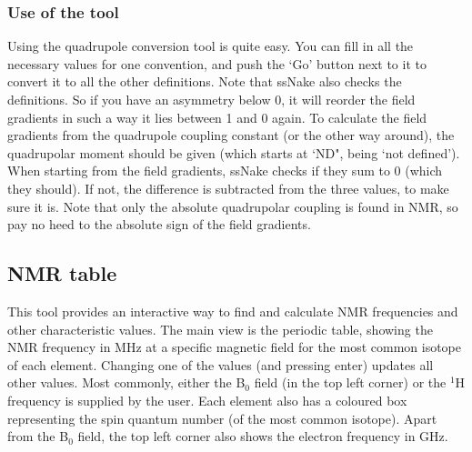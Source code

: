\documentclass[11pt,a4paper]{article}
\begin{document}
\subsubsection*{Use of the tool}
Using the quadrupole conversion tool is quite easy. You can fill in all the necessary values for one convention, and push the `Go' button next to it to convert it to all the other definitions. Note that ssNake also checks the definitions. So if you have an asymmetry below 0, it will reorder the field gradients in such a way it lies between 1 and 0 again. To calculate the field gradients from the quadrupole coupling constant (or the other way around), the quadrupolar moment should be given (which starts at `ND", being `not defined'). When starting from the field gradients, ssNake checks if they sum to 0 (which they should). If not, the difference is subtracted from the three values, to make sure it is. Note that only the absolute quadrupolar coupling is found in NMR, so pay no heed to the absolute sign of the field gradients.


\subsection{NMR table}
This tool provides an interactive way to find and calculate NMR frequencies and other characteristic
values. The main view is the periodic table, showing the NMR frequency in MHz at a specific magnetic
field for the most common isotope of each element. Changing one of the values (and pressing enter)
updates all other values. Most commonly, either the B$_0$ field (in the top left corner) or the
$^1$H frequency is supplied by the user. Each element also has a coloured box representing the spin
quantum number (of the most common isotope). Apart from the B$_0$ field, the top left corner also
shows the electron frequency in GHz.
\end{document}
